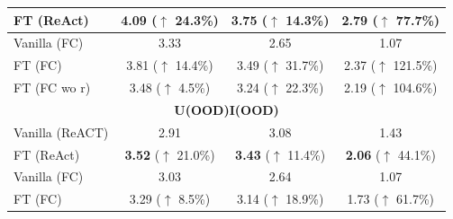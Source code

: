 \documentclass[11pt]{article}
\begin{document}
\begin{table}[t]
{{\begin{tabular}{l | c c c }
		\quad FT (ReAct)
  
        & \textbf{4.09} ($\uparrow$ 24.3\%)
        & \textbf{3.75} ($\uparrow$ 14.3\%)
        & \textbf{2.79} ($\uparrow$ 77.7\%) 

        \\
        \midrule

        
        Vanilla (FC)
        & 3.33
        & 2.65
        & 1.07

        \\


        \quad FT (FC)
 
        & 3.81 ($\uparrow$ 14.4\%) 
        & 3.49 ($\uparrow$ 31.7\%) 
        & 2.37 ($\uparrow$ 121.5\%)
        
        \\

        
        
        \quad FT (FC wo r)

        & 3.48 ($\uparrow$ 4.5\%)
        & 3.24 ($\uparrow$ 22.3\%)
        & 2.19 ($\uparrow$ 104.6\%)
       
		\\
        \midrule

        \multicolumn{4}{c}{\textbf{U(OOD)I(OOD)}}
        \\
        \midrule
        \midrule




        Vanilla (ReACT)
		
        & 2.91
        & 3.08 
		& 1.43
        
		\\
  
		\quad FT (ReAct)
		
        & \textbf{3.52} ($\uparrow$ 21.0\%)
        & \textbf{3.43} ($\uparrow$ 11.4\%) 
		& \textbf{2.06} ($\uparrow$ 44.1\%)

        \\
        \midrule

        
        Vanilla (FC)
		
        & 3.03
        & 2.64 
		& 1.07

        \\


        \quad FT (FC)
		
        & 3.29 ($\uparrow$ 8.5\%)
        & 3.14 ($\uparrow$ 18.9\%) 
		& 1.73 ($\uparrow$ 61.7\%)
        

\end{tabular}}}
\end{table}
\end{document}
